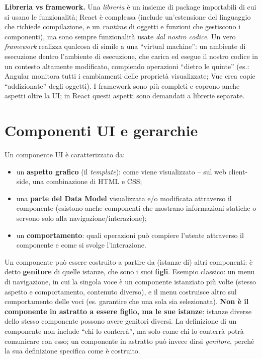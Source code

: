 \textbf{Libreria vs framework.} Una \emph{libreria} \`e un insieme di package importabili di
cui si usano le funzionalit\`a; React \`e complessa (include un'estensione del linguaggio che
richiede compilazione, e un \emph{runtime} di oggetti e funzioni che gestiscono i
componenti), ma sono sempre funzionalit\`a usate \emph{dal nostro codice}. Un vero
\emph{framework} realizza qualcosa di simile a una ``virtual machine'': un ambiente di
esecuzione dentro l'ambiente di esecuzione, che carica ed esegue il nostro codice in un
contesto altamente modificato, compiendo operazioni ``dietro le quinte'' (es.: Angular
monitora tutti i cambiamenti delle propriet\`a visualizzate; Vue crea copie ``addizionate''
degli oggetti). I framework sono pi\`u completi e coprono anche aspetti oltre la UI; in React
questi aspetti sono demandati a librerie separate.

\section{Componenti UI e gerarchie}

\begin{definizione}[Componente UI]
Un componente UI \`e caratterizzato da:
\begin{itemize}
  \item un \textbf{aspetto grafico} (il \emph{template}): come viene visualizzato -- sul web
        client-side, una combinazione di HTML e CSS;
  \item una \textbf{parte del Data Model} visualizzata e/o modificata attraverso il
        componente (esistono anche componenti che mostrano informazioni statiche o servono
        solo alla navigazione/interazione);
  \item un \textbf{comportamento}: quali operazioni pu\`o compiere l'utente attraverso il
        componente e come si svolge l'interazione.
\end{itemize}
\end{definizione}

\begin{importante}
Un componente pu\`o essere costruito a partire da (istanze di) altri componenti: \`e detto
\textbf{genitore} di quelle istanze, che sono i suoi \textbf{figli}. Esempio classico: un
menu di navigazione, in cui la singola voce \`e un componente istanziato pi\`u volte (stesso
aspetto e comportamento, contenuto diverso), e il menu costruisce altro sul comportamento
delle voci (es. garantire che una sola sia selezionata). \textbf{Non \`e il componente in
astratto a essere figlio, ma le sue istanze}: istanze diverse dello stesso componente possono
avere genitori diversi. La definizione di un componente non include ``chi lo conterr\`a'', ma
solo come chi lo conterr\`a potr\`a comunicare con esso; un componente in astratto pu\`o
invece dirsi \emph{genitore}, perch\'e la sua definizione specifica come \`e costruito.
\end{importante}

